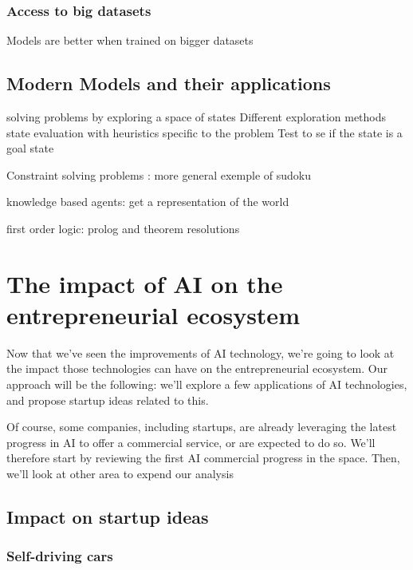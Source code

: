 \documentclass[12pt]{article}
\begin{document}
\subsubsection{Access to big datasets}

Models are better when trained on bigger datasets

\subsection{Modern Models and their applications}

solving problems by exploring a space of states
Different exploration methods
state evaluation with heuristics specific to the problem
Test to se if the state is a goal state

Constraint solving problems : more general
exemple of sudoku


knowledge based agents: get a representation of the world

first order logic: prolog and theorem resolutions

\pagebreak



\section{The impact of AI on the entrepreneurial ecosystem}

Now that we've seen the improvements of AI technology, we're going to look at
the impact those technologies can have on the entrepreneurial ecosystem.
Our approach will be the following: we'll explore a few applications of AI
technologies, and propose startup ideas related to this.

Of course, some companies, including startups, are already leveraging the latest
 progress in AI to offer a commercial service, or are expected to do so.
 We'll therefore start by reviewing the first AI commercial progress in the
 space. Then, we'll look at other area to expend our analysis

\subsection{Impact on startup ideas}

\subsubsection{Self-driving cars}
\end{document}
